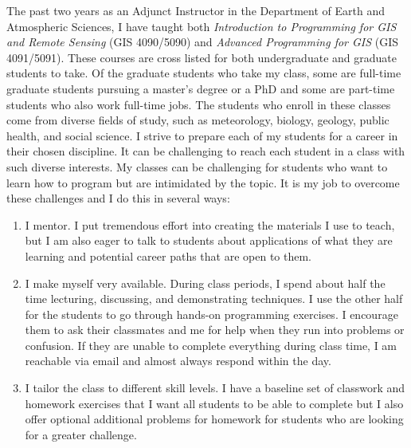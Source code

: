 \documentclass{res}
\begin{document}
\begin{resume}
\par The past two years as an Adjunct Instructor in the Department of Earth and Atmospheric Sciences, I have taught both \textit{Introduction to Programming for GIS and Remote Sensing} (GIS 4090/5090) and \textit{Advanced Programming for GIS} (GIS 4091/5091). These courses are cross listed for both undergraduate and graduate students to take. Of the graduate students who take my class, some are full-time graduate students pursuing a master’s degree or a PhD and some are part-time students who also work full-time jobs. The students who enroll in these classes come from diverse fields of study, such as meteorology, biology, geology, public health, and social science. I strive to prepare each of my students for a career in their chosen discipline. It can be challenging to reach each student in a class with such diverse interests. My classes can be challenging for students who want to learn how to program but are intimidated by the topic. It is my job to overcome these challenges and I do this in several ways:
\newline
\begin{enumerate}
\item I mentor. I put tremendous effort into creating the materials I use to teach, but I am also eager to talk to students about applications of what they are learning and potential career paths that are open to them. 
\item I make myself very available. During class periods, I spend about half the time lecturing, discussing, and demonstrating techniques. I use the other half for the students to go through hands-on programming exercises. I encourage them to ask their classmates and me for help when they run into problems or confusion. If they are unable to complete everything during class time, I am reachable via email and almost always respond within the day.
\item I tailor the class to different skill levels. I have a baseline set of classwork and homework exercises that I want all students to be able to complete but I also offer optional additional problems for homework for students who are looking for a greater challenge.

\end{enumerate}
\end{resume}
\end{document}
